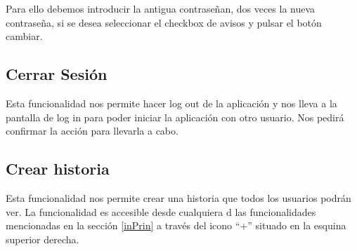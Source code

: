 \documentclass[11pt,a4paper, titlepage]{article}
\begin{document}
	Para ello debemos introducir la antigua contraseñan, dos veces la nueva contraseña, si se desea seleccionar el checkbox de avisos y pulsar el botón cambiar.
	
	\FloatBarrier
	\subsection[Cerrar Sesión]{Cerrar Sesión}
	Esta funcionalidad nos permite hacer log out de la aplicación y nos lleva a la pantalla de log in para poder iniciar la aplicación con otro usuario. Nos pedirá confirmar la acción para llevarla a cabo. 
	
	
	\FloatBarrier
	\subsection{Crear historia}
	Esta funcionalidad nos permite crear una historia que todos los usuarios podrán ver. La funcionalidad es accesible desde cualquiera d las funcionalidades mencionadas en la sección \ref{inPrin} a través del icono ``+'' situado en la esquina superior derecha.
	
\end{document}
